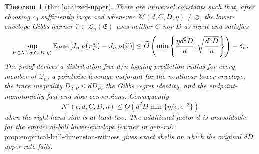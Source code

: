 \documentclass{article}
\newtheorem{theorem}{Theorem}
\begin{document}
\begin{theorem}[thm:localized-upper]\label{thm:localized-upper}
There are universal constants such that, after choosing \(c_0\) sufficiently large and whenever \(\mathcal M(d,C,D,\eta)\ne\varnothing\), the lower-envelope Gibbs learner \(\widehat\pi\in\mathcal L_n(\mathfrak E)\) uses neither \(C\) nor \(D\) as input and satisfies
\[
\makebox[\linewidth][c]{\resizebox{0.98\linewidth}{!}{\(\displaystyle \sup_{P\in\mathcal M(d,C,D,\eta)}\mathbb E_{P^{\otimes n}}[J_{\eta,P}(\pi_P^\star)-J_{\eta,P}(\widehat\pi)]
\le\widetilde O\left(\min\left\{\frac{\eta d^2D}{n},\sqrt{\frac{d^2D}{n}}\right\}\right)+\delta_n.\)}}
\]
The proof derives a distribution-free \(d/n\) logging prediction radius for every member of \(\mathcal Q_n\), a pointwise leverage majorant for the nonlinear lower envelope, the trace inequality \(D_{2,P}\le dD_P\), the Gibbs regret identity, and the endpoint-monotonicity fast and slow conversions. Consequently
\[
N^\star(\epsilon;d,C,D,\eta)
\le\widetilde O\left(d^2D\min\{\eta/\epsilon,\epsilon^{-2}\}\right)
\]
when the right-hand side is at least two. The additional factor \(d\) is unavoidable for the empirical-ball lower-envelope learner in general: \(\text{prop:empirical-ball-dimension-witness}\) gives exact shells on which the original \(dD\) upper rate fails.
\end{theorem}
\end{document}
